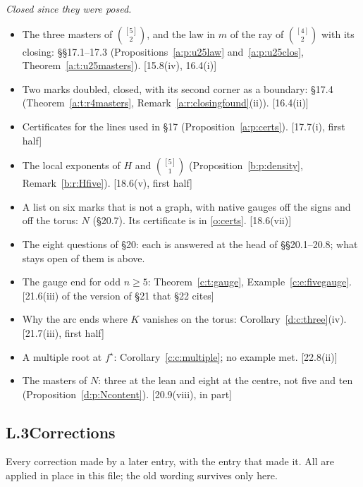 \documentclass[11pt]{article}
\theoremstyle{plain}
\theoremstyle{definition}
\theoremstyle{remark}
\begin{document}
\noindent\emph{Closed since they were posed.}
\begin{itemize}[leftmargin=*,itemsep=1pt]
\item The three masters of $\binom{[5]}2$, and the law in $m$ of the ray of $\binom{[4]}2$ with its closing: \S\S17.1--17.3 (Propositions~\ref{a:p:u25law} and~\ref{a:p:u25clos}, Theorem~\ref{a:t:u25masters}). {\small[15.8(iv), 16.4(i)]}
\item Two marks doubled, closed, with its second corner as a boundary: \S17.4 (Theorem~\ref{a:t:r4masters}, Remark~\ref{a:r:closingfound}(ii)). {\small[16.4(ii)]}
\item Certificates for the lines used in \S17 (Proposition~\ref{a:p:certs}). {\small[17.7(i), first half]}
\item The local exponents of $H$ and $\binom{[5]}1$ (Proposition~\ref{b:p:density}, Remark~\ref{b:r:Hfive}). {\small[18.6(v), first half]}
\item A list on six marks that is not a graph, with native gauges off the signs and off the torus: $N$ (\S20.7). Its certificate is in \ref{o:certs}. {\small[18.6(vii)]}
\item The eight questions of \S20: each is answered at the head of \S\S20.1--20.8; what stays open of them is above.
\item The gauge end for odd $n\ge5$: Theorem~\ref{c:t:gauge}, Example~\ref{c:e:fivegauge}. {\small[21.6(iii) of the version of \S21 that \S22 cites]}
\item Why the arc ends where $K$ vanishes on the torus: Corollary~\ref{d:c:three}(iv). {\small[21.7(iii), first half]}
\item A multiple root at $f^\star$: Corollary~\ref{c:c:multiple}; no example met. {\small[22.8(ii)]}
\item The masters of $N$: three at the lean and eight at the centre, not five and ten (Proposition~\ref{d:p:Ncontent}). {\small[20.9(viii), in part]}
\end{itemize}

\subsection*{L.3\quad Corrections}

Every correction made by a later entry, with the entry that made it. All are applied in place in this file; the old wording survives only here.
\end{document}

